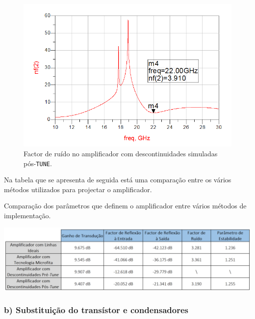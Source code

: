 \documentclass[11pt]{article}
\numberwithin{equation}{section}
\begin{document}
\begin{figure}[H]
	\centering
	\includegraphics[keepaspectratio=true, scale=0.45]{exps/descont_noise_pos_tune}
	\vspace{-0.5em}
	\caption{Factor de ruído no amplificador com descontinuidades simuladas pós-\texttt{TUNE}.}
	\vspace{-0.8em}
	\label{fig:descont_noise_pos_tune}
\end{figure}

Na tabela que se apresenta de seguida está uma comparação entre os vários métodos utilizados para projectar o amplificador.

\begin{table}[H]
	\centering
	\caption{Comparação dos parâmetros que definem o amplificador entre vários métodos de implementação.}
	\vspace{-1.5mm}
	\includegraphics[keepaspectratio=true, scale=0.45]{exps/compfinal}
\end{table}


\subsubsection{b) Substituição do transístor e condensadores}
\end{document}
